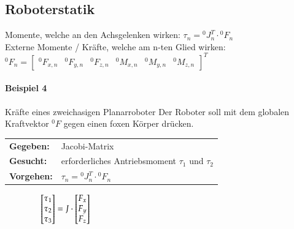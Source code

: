 \subsection{Roboterstatik}
Momente, welche an den Achsgelenken wirken:\newline
$\tau_{n}={}^0J^T_n \cdot {}^0F_n$  \\
Externe Momente / Kräfte, welche am n-ten Glied wirken:\newline
${}^0F_n = \begin{bmatrix} {}^0F_{x,n} & {}^0F_{y,n} & {}^0F_{z,n} & {}^0M_{x,n}
& {}^0M_{y,n} & {}^0M_{z,n}
\end{bmatrix}^{T} $ \newline
\paragraph{Beispiel 4} Kräfte eines zweichasigen Planarroboter\newline
Der Roboter soll mit dem globalen Kraftvektor ${}^0F$ gegen einen foxen Körper drücken.\newline
\null\hspace{0.5cm}\begin{tabular}{ll}
    \textbf{Gegeben:}& Jacobi-Matrix\\
    \textbf{Gesucht:}& erforderliches Antriebsmoment $\tau_1$ und $\tau_2$\\
    \textbf{Vorgehen:} & $\tau_{n}={}^0J^T_n \cdot {}^0F_n$  \\
\end{tabular}$\null \qquad\qquad
\begin{bmatrix}
\tau_{1} \\ \tau_{2} \\ \tau_{3}
\end{bmatrix}          
=  J \cdot
\begin{bmatrix}
F_{x} \\ F_{y} \\ F_{z}
\end{bmatrix}
$
\clearpage


